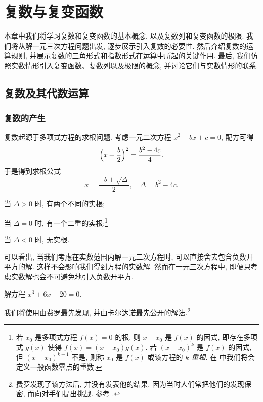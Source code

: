 \chapter{复数与复变函数}
\label{chapter:1}

本章中我们将学习复数和复变函数的基本概念, 以及复数列和复变函数的极限.
我们将从解一元三次方程问题出发, 逐步展示引入复数的必要性. 然后介绍复数的运算规则, 并展示复数的三角形式和指数形式在运算中所起的关键作用. 最后, 我们仿照实数情形引入复变函数、复数列以及极限的概念, 并讨论它们与实数情形的联系.


\section{复数及其代数运算}

\subsection{复数的产生}
\label{ssec:motivation-complex-numbers}

复数起源于多项式方程的求根问题. 
考虑一元二次方程 $x^2+bx+c=0$, 配方可得
\[
  \Bigl(x+\frac b2\Bigr)^2=\frac{b^2-4c}4.
\]
于是得到求根公式
\[
  x=\frac{-b\pm\sqrt\Delta}2,\quad 
  \Delta=b^2-4c.
\]

\begin{enuma}
  \item 当 $\Delta>0$ 时, 有两个不同的实根;
  \item 当 $\Delta=0$ 时, 有一个二重的实根;\footnote{%
    若 $x_0$ 是多项式方程 $f(x)=0$ 的根, 则 $x-x_0$ 是 $f(x)$ 的因式, 即存在多项式 $g(x)$ 使得 $f(x)=(x-x_0)g(x)$.
    若 $(x-x_0)^k$ 是 $f(x)$ 的因式, 但 $(x-x_0)^{k+1}$ 不是, 则称 $x_0$ 是 $f(x)$ 或该方程的 \emph{$k$ 重根}.
    在 中我们将会定义一般函数零点的重数.
  }
  \item 当 $\Delta<0$ 时, 无实根.
\end{enuma}

可以看出, 当我们考虑在实数范围内解一元二次方程时, 可以直接舍去包含\alert{负数开平方}的解.
这样不会影响我们得到方程的实数解.
然而在一元三次方程中, 即便只考虑实数解也会不可避免地引入负数开平方.

\begin{example}
  解方程 $x^3+6x-20=0$.
\end{example}

我们将使用由费罗最先发现, 并由卡尔达诺最先公开的解法.\footnote{%
  费罗发现了该方法后, 并没有发表他的结果, 因为当时人们常把他们的发现保密, 而向对手们提出挑战. 参考 \cite[第13章4节]{Kline1990}.
}

